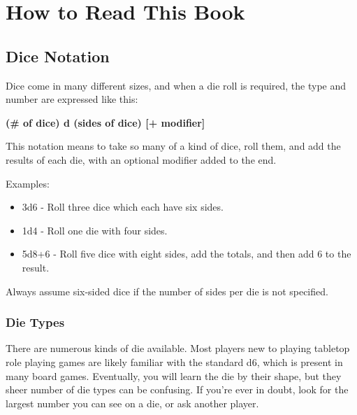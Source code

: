 \chapter{How to Read This Book}
\section{Dice Notation}
Dice come in many different sizes, and when a die roll is required, the type and number are expressed like this:

\begin{normboxc}
\textbf{(\# of dice) d (sides of dice) [+ modifier]}
\end{normboxc}

This notation means to take so many of a kind of dice, roll them, and add the results of each die, with an optional modifier added to the end.

Examples:
\begin{itemize}
\item 3d6 - Roll three dice which each have six sides.
\item 1d4 - Roll one die with four sides.
\item 5d8+6 - Roll five dice with eight sides, add the totals, and then add 6 to the result.
\end{itemize}

\begin{normboxc}
Always assume six-sided dice if the number of sides per die is not specified.
\end{normboxc}

\subsection{Die Types}
There are numerous kinds of die available. Most players new to playing tabletop role playing games are likely familiar with the standard d6, which is present in many board games. Eventually, you will learn the die by their shape, but they sheer number of die types can be confusing. If you're ever in doubt, look for the largest number you can see on a die, or ask another player.

